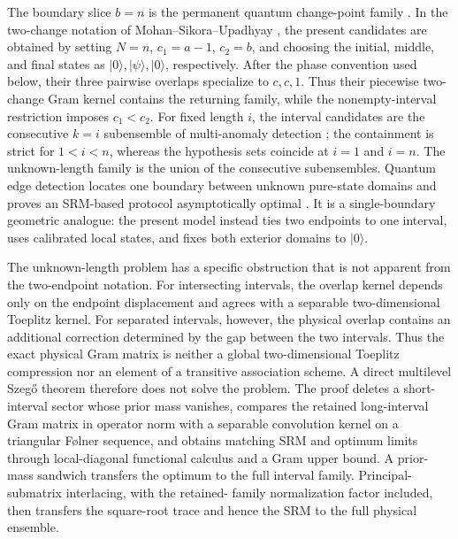 The boundary slice \(b=n\) is the permanent quantum change-point family
\cite{sentis2016,sentis2017,sentis2018}. In the two-change notation of
Mohan--Sikora--Upadhyay \cite{mohan2023}, the present candidates are obtained
by setting \(N=n\), \(c_1=a-1\), \(c_2=b\), and choosing the initial, middle,
and final states as \(\lvert0\rangle,\lvert\psi\rangle,\lvert0\rangle\),
respectively. After the phase convention used below, their three pairwise
overlaps specialize to \(c,c,1\). Thus their piecewise two-change Gram kernel
contains the returning family, while the nonempty-interval restriction imposes
\(c_1<c_2\). For fixed length \(i\), the interval candidates are the
consecutive \(k=i\) subensemble of multi-anomaly detection
\cite{llorens2024}; the containment is strict for \(1<i<n\), whereas the
hypothesis sets coincide at \(i=1\) and \(i=n\). The unknown-length family is
the union of the consecutive subensembles. Quantum edge detection locates one
boundary between unknown pure-state domains and proves an SRM-based protocol
asymptotically optimal \cite{llorens2025}. It is a single-boundary geometric
analogue: the present model instead ties two endpoints to one interval, uses
calibrated local states, and fixes both exterior domains to
\(\lvert0\rangle\).

The unknown-length problem has a specific obstruction that is not apparent from the
two-endpoint notation. For intersecting intervals, the overlap kernel depends
only on the endpoint displacement and agrees with a separable two-dimensional
Toeplitz kernel. For separated intervals, however, the physical overlap
contains an additional correction determined by the gap between the two
intervals. Thus the exact physical Gram matrix is neither a global
two-dimensional Toeplitz compression nor an element of a transitive
association scheme. A direct multilevel Szeg{\H o} theorem therefore does not
solve the problem. The proof deletes a short-interval sector whose prior mass
vanishes, compares the retained long-interval Gram matrix in operator norm
with a separable convolution kernel on a triangular Følner sequence, and
obtains matching SRM and optimum limits through local-diagonal functional
calculus and a Gram upper bound. A prior-mass sandwich transfers the optimum to
the full interval family. Principal-submatrix interlacing, with the retained-
family normalization factor included, then transfers the square-root trace and
hence the SRM to the full physical ensemble.

